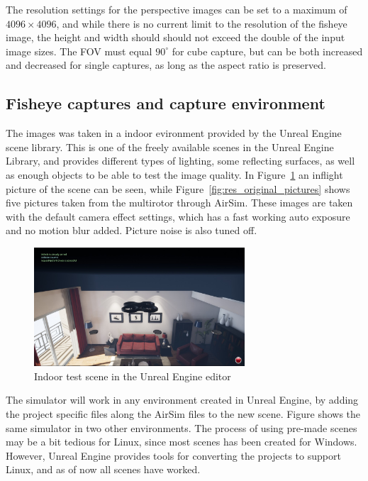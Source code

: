 The resolution settings for the perspective images can be set to a maximum of $4096\times4096$, and while there is no current limit to the resolution of the fisheye image, the height and width should should not exceed the double of the input image sizes. The FOV must equal $90^\circ$ for cube capture, but can be both increased and decreased for single captures, as long as the aspect ratio is preserved. 

\subsection{Fisheye captures and capture environment}

The images was taken in a indoor evironment provided by the Unreal Engine scene library. This is one of the freely available scenes in the Unreal Engine Library, and provides different types of lighting, some reflecting surfaces, as well as enough objects to be able to test the image quality. In Figure~\ref{fig:res_inflight} an inflight picture of the scene can be seen, while Figure~\ref{fig:res_original_pictures} shows five pictures taken from the multirotor through AirSim. These images are taken with the default camera effect settings, which has a fast working auto exposure and no motion blur added. Picture noise is also tuned off.

\begin{figure}[!htb]
    \centering
    \includegraphics[width = 0.7\textwidth]{rapport/fig/Results/inflight.jpg}
    \caption{Indoor test scene in the Unreal Engine editor}
    \label{fig:res_inflight}
\end{figure}

The simulator will work in any environment created in Unreal Engine, by adding the project specific files along the AirSim files to the new scene. Figure  shows the same simulator in two other environments. The process of using pre-made scenes may be a bit tedious for Linux, since most scenes has been created for Windows. However, Unreal Engine provides tools for converting the projects to support Linux, and as of now all scenes have worked.

